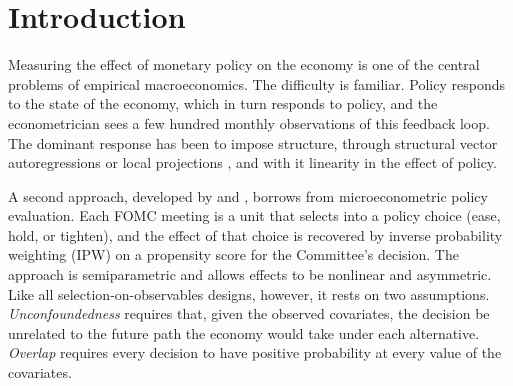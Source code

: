 \section{Introduction}\label{sec:intro}

Measuring the effect of monetary policy on the economy is one of the central problems of empirical
macroeconomics. The difficulty is familiar. Policy responds to the state of the economy, which in turn responds to
policy, and the econometrician sees a few hundred monthly observations of this feedback loop. The dominant
response has been to impose structure, through structural vector autoregressions \citep{sims1980} or local
projections \citep{jorda2005}, and with it linearity in the effect of policy.

A second approach, developed by \citet{angrist2011} and \citet{angrist2018}, borrows from microeconometric policy
evaluation. Each FOMC meeting is a unit that selects into a policy choice (ease, hold, or tighten), and the
effect of that choice is recovered by inverse probability weighting (IPW) on a propensity score for the
Committee's decision. The approach is semiparametric and allows effects to be nonlinear and asymmetric. Like all
selection-on-observables designs, however, it rests on two assumptions. \emph{Unconfoundedness} requires that,
given the observed covariates, the decision be unrelated to the future path the economy would take under each
alternative. \emph{Overlap} requires every decision to have positive probability at every value of the covariates.

